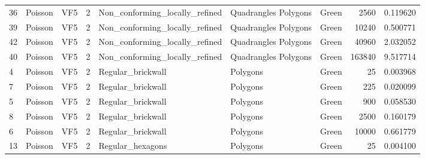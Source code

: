 \begin{tabular}{lllrlllrr}
36  &           Poisson &                            VF5 &               2 &  Non\_conforming\_locally\_refined &   Quadrangles Polygons  &                                Green &                     2560 &                         0.119620 \\
39  &           Poisson &                            VF5 &               2 &  Non\_conforming\_locally\_refined &   Quadrangles Polygons  &                                Green &                    10240 &                         0.500771 \\
42  &           Poisson &                            VF5 &               2 &  Non\_conforming\_locally\_refined &   Quadrangles Polygons  &                                Green &                    40960 &                         2.032052 \\
40  &           Poisson &                            VF5 &               2 &  Non\_conforming\_locally\_refined &   Quadrangles Polygons  &                                Green &                   163840 &                         9.517714 \\
4   &           Poisson &                            VF5 &               2 &               Regular\_brickwall &               Polygons  &                                Green &                       25 &                         0.003968 \\
7   &           Poisson &                            VF5 &               2 &               Regular\_brickwall &               Polygons  &                                Green &                      225 &                         0.020099 \\
5   &           Poisson &                            VF5 &               2 &               Regular\_brickwall &               Polygons  &                                Green &                      900 &                         0.058530 \\
8   &           Poisson &                            VF5 &               2 &               Regular\_brickwall &               Polygons  &                                Green &                     2500 &                         0.160179 \\
6   &           Poisson &                            VF5 &               2 &               Regular\_brickwall &               Polygons  &                                Green &                    10000 &                         0.661779 \\
13  &           Poisson &                            VF5 &               2 &                Regular\_hexagons &               Polygons  &                                Green &                       25 &                         0.004100 \\

\end{tabular}
